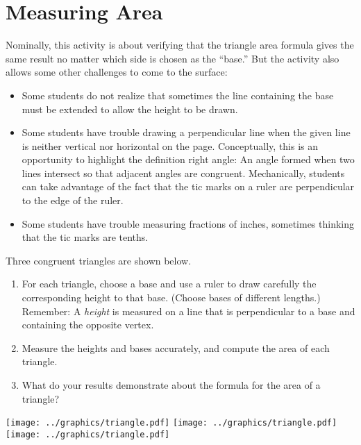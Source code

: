 \newpage

\section{Measuring Area}

\begin{teachingnote}
Nominally, this activity is about verifying that the triangle area formula gives the same result no matter which
side is chosen as the ``base.''  But the activity also allows some other challenges to come to the surface:  
\begin{itemize}
\item Some students do not realize that sometimes the line containing the base must be 
extended to allow the height to be drawn. 
\item Some students have trouble drawing a perpendicular line when the given line is neither vertical nor 
horizontal on the page.  Conceptually, this is an opportunity to highlight the definition right angle:  An angle formed when two lines intersect so that adjacent angles are congruent.  Mechanically, students can take advantage of the fact that the tic marks on 
a ruler are perpendicular to the edge of the ruler.  
\item Some students have trouble measuring fractions of inches, sometimes thinking that the tic marks are tenths.  
\end{itemize}
\end{teachingnote}

\begin{prob}
Three congruent triangles are shown below.   
\begin{enumerate}
\item For each triangle, choose a base and use a ruler to draw carefully the corresponding height to that base.  (Choose bases of different lengths.)  Remember:  A \emph{height} is measured on a line that is perpendicular to a base and containing the opposite vertex. 
\item Measure the heights and bases accurately, and compute the area of each triangle.  
\item What do your results demonstrate about the formula for the area of a triangle?  
\end{enumerate}

\vfill
\begin{fullwidth}
\texttt{[image: ../graphics/triangle.pdf]}
\texttt{[image: ../graphics/triangle.pdf]}
\texttt{[image: ../graphics/triangle.pdf]}
\end{fullwidth}

\end{prob}
\vfill
